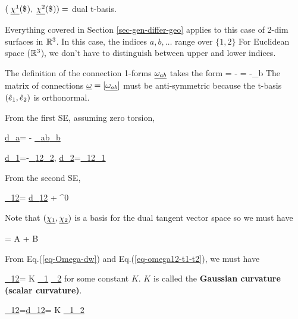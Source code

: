 $(\pform{\chi^1}{}, \pform{\chi^2}{})=$ dual t-basis. 

Everything covered in Section 
\ref{sec-gen-differ-geo} applies to
this case of 2-dim surfaces in ${ \mathbb{R}}^3$.
In this case, the indices $a, b,\ldots$ 
range over $\{1, 2\}$
For Euclidean space (${ \mathbb{R}}^3$), we don't have
to distinguish between upper and lower indices.

The definition of the connection 1-forms
$\ul{\omega_{ab}}$ takes the form
\beq
{}=
-
\eeq
\beq
{}=
-\hate_b
\eeq
The  matrix of connections
$\ul{\omega}=[\ul{\omega_{ab}}]$ must be anti-symmetric because the t-basis $({\hat{e}}_1, {\hat{e}}_2)$
is orthonormal.


From the first SE,
assuming zero torsion,

\beq
\ul{d\chi_a}=
-
\ul{\omega_{ab}}\wedge \ul{\chi_b}
\eeq

\beq
\boxed
{\ul{d\chi_1}=-\ul{\omega_{12}}\wedge\ul{\chi_2},\quad
\ul{d\chi_2}=\ul{\omega_{12}}\wedge\ul{\chi_1}}
\eeq

From the second SE,

\beq
\ul{\Omega_{12}}=
\ul{d\omega_{12}} +
^0
\label{eq-Omega-dw}
\eeq

Note that $(\ul{\chi_1},\ul{\chi_2})$ is a basis for the dual
tangent vector space so we must have

\beq
{}=
A  + B
\label{eq-omega12-t1-t2}
\eeq

From
Eq.(\ref{eq-Omega-dw})
and  Eq.(\ref{eq-omega12-t1-t2}), we must have

\beq
\ul{\Omega_{12}}=
K \ul{\omega_1}
\wedge\ul{\omega_2}
\eeq
for some constant $K$.
$K$ is called the {\bf Gaussian  curvature (scalar curvature)}.


\beq
\boxed
{\ul{\Omega_{12}}=\ul{d\omega_{12}}= K
\ul{\chi_1}\wedge\ul{\chi_2}}
\label{eq-K-theta1-theta2}
\eeq


